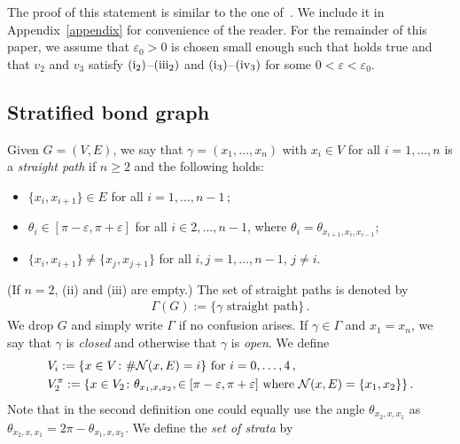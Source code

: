 \documentclass[reqno]{amsart}
\theoremstyle{plain}
\theoremstyle{definition}
\numberwithin{equation}{section}
\begin{document}
The proof of this statement is similar to the one of~\cite[Lemma~3.2]{FriedrichKreutz}. We include it in   Appendix~\ref{appendix} for convenience of the reader.     For the remainder of this paper, we assume that $\varepsilon_0>0$ is chosen small enough such that  holds true and that $v_2$ and $v_3$ satisfy $({\rm i}_2)$--$({\rm iii}_2)$ and $({\rm i}_3)$--$({\rm iv}_3)$  for some $0<\varepsilon<\varepsilon_0$.


\subsection{Stratified bond graph}  \label{subsec:stratbondgraph}


Given $G=(V,E)$, we say that $\gamma=(x_1,\ldots,x_n)$ with $x_i \in V   $   for all $i=1,\ldots,n$ is  a \emph{straight path} if  $n \ge 2$ and the following holds:  
\begin{itemize}
\item[(i)] $\{x_i,x_{i+1}\} \in E$ for all $i=1,\ldots,n-1\,$;
\item[(ii)] $\theta_i \in [\pi-\varepsilon,\pi+\varepsilon]$ for all $i \in 2,\ldots,n-1$, where   $\theta_i =\theta_{x_{i+1},x_i,x_{i-1}}$;   
\item[(iii)] $\{x_i,x_{i+1}\} \neq \{x_{j},x_{j+1}\}$ for all $i,j =1,\ldots,n-1$, $ j \neq i$.
\end{itemize}
 (If $n=2$, (ii) and (iii) are empty.)  The set of straight paths is denoted by
\begin{align*}
\Gamma (G) :=\{\gamma \text{ straight path}\}\,.
\end{align*}
 We drop $G$ and  simply  write $\Gamma$ if no confusion arises.
If $\gamma \in \Gamma$ and $x_1=x_n$, we say that $\gamma$ is \emph{closed} and otherwise that $\gamma$ is \emph{open}.   We define   
\begin{align*}
\begin{split}
&V_i :=\{x \in V \colon \# \mathcal{N}(x,E) = i  \} \text{  for $i=0,\ldots,4$\,,} \\&V_2^\pi :=\{x \in V_2 \colon  \theta_{x_1,x,x_2},   \in [\pi-\varepsilon,\pi+\varepsilon] \text{ where } \mathcal{N}(x,E) = \lbrace x_1,x_2 \rbrace \}\,.
\end{split}
\end{align*}
 Note that in the second definition one could equally use the angle $\theta_{x_2,x,x_1}$ as $\theta_{x_2,x,x_1} = 2\pi - \theta_{x_1,x,x_2}$. We define the \emph{set of strata} by
\end{document}
